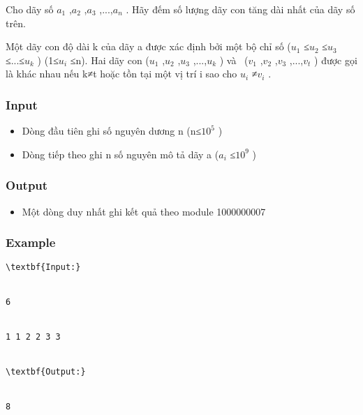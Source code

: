 



   Cho dãy số $a_{1}$   ,$a_{2}$   ,$a_{3}$   ,...,$a_{n}$   .  Hãy đếm số lượng dãy con tăng dài nhất của dãy số trên.  

   Một dãy  con độ dài k của dãy a được xác định bởi một bộ chỉ số ($u_{1}$   ≤$u_{2}$   ≤$u_{3}$   ≤...≤$u_{k}$   )  (1≤$u_{i}$   ≤n). Hai dãy con ($u_{1}$   ,$u_{2}$   ,$u_{3}$   ,...,$u_{k}$   )  và  ($v_{1}$   ,$v_{2}$   ,$v_{3}$   ,...,$v_{t}$   ) được  gọi là khác nhau nếu k≠t hoặc tồn tại một vị trí i sao cho $u_{i}$   ≠$v_{i}$   .  

\subsubsection{   Input  }
\begin{itemize}
	\item     Dòng đầu tiên ghi số nguyên dương n (n≤$10^{5}$    )   
	\item     Dòng  tiếp theo ghi n số nguyên mô tả dãy a ($a_{i}$    ≤$10^{9}$    )   
\end{itemize}

\subsubsection{   Output  }
\begin{itemize}
	\item     Một dòng duy nhất ghi kết quả theo module 1000000007   
\end{itemize}

\subsubsection{   Example  }
\begin{verbatim}
\textbf{Input:}


6


1 1 2 2 3 3


\textbf{Output:}


8


\end{verbatim}

